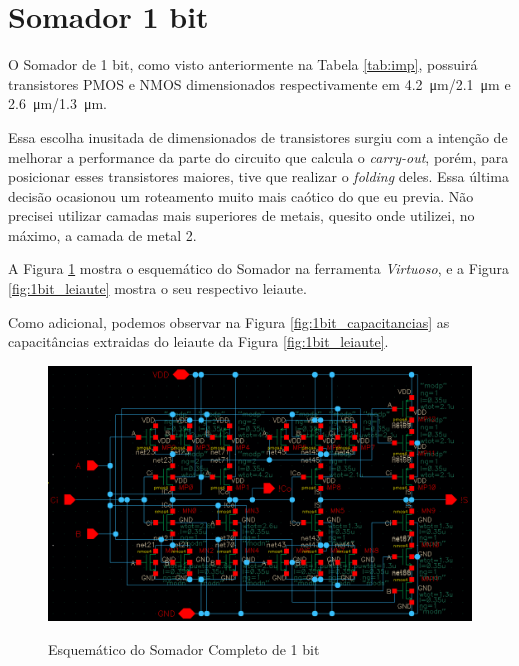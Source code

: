 \documentclass{iiufrgs}
\newcommand{\virtuoso}{\textit{Virtuoso}}
\begin{document}
\FloatBarrier


\section{Somador 1 bit}\label{adder_1bit}
O Somador de 1 bit, como visto anteriormente na Tabela \ref{tab:imp}, possuirá transistores PMOS e NMOS dimensionados respectivamente em \SI{4.2}{\um}/\SI{2.1}{\um} e \SI{2.6}{\um}/\SI{1.3}{\um}. 

Essa escolha inusitada de dimensionados de transistores surgiu com a intenção de melhorar a performance da parte do circuito que calcula o \textit{carry-out}, porém, para posicionar esses transistores maiores, tive que realizar o \textit{folding} deles. Essa última decisão ocasionou um roteamento muito mais caótico do que eu previa. Não precisei utilizar camadas mais superiores de metais, quesito onde utilizei, no máximo, a camada de metal 2.

A Figura \ref{fig:1bit_esquematico} mostra o esquemático do Somador na ferramenta \virtuoso, e a Figura \ref{fig:1bit_leiaute} mostra o seu respectivo leiaute.

Como adicional, podemos observar na Figura \ref{fig:1bit_capacitancias} as capacitâncias extraidas do leiaute da Figura \ref{fig:1bit_leiaute}.

\begin{figure}[htbp]
    \centering
    \caption{Esquemático do Somador Completo de 1 bit}
    \includegraphics[scale=0.45]{images/schem_1bit.png}
    \label{fig:1bit_esquematico}
\end{figure}
\end{document}
